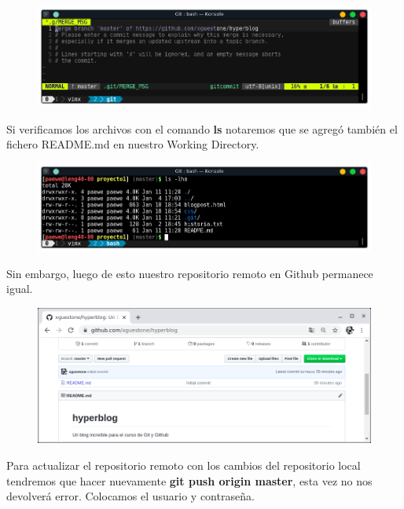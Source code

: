 \documentclass{article}
\begin{document}
\begin{figure}[h!]
  \centering
  \includegraphics[scale=0.75]{./Pictures/194_commit_message.png}
\end{figure}

Si verificamos los archivos con el comando \textbf{ls} notaremos que se agregó
también el fichero README.md en nuestro Working Directory.

\newpage

\begin{figure}[h!]
  \centering
  \includegraphics[scale=0.75]{./Pictures/195_ls.png}
\end{figure}

Sin embargo, luego de esto nuestro repositorio remoto en Github permanece igual.

\begin{figure}[h!]
  \centering
  \includegraphics[scale=0.75]{./Pictures/196_github_igual.png}
\end{figure}

Para actualizar el repositorio remoto con los cambios del repositorio local
tendremos que hacer nuevamente \textbf{git push origin master}, esta vez no nos
devolverá error. Colocamos el usuario y contraseña.
\end{document}
